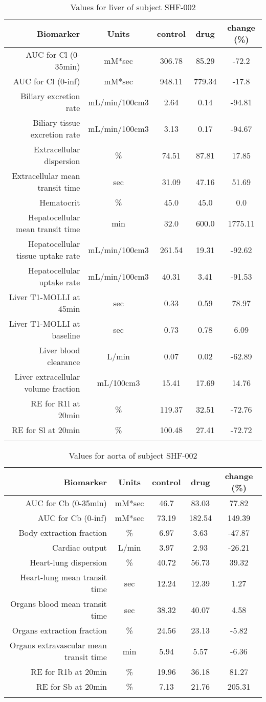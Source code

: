 \documentclass{epflreport}%
\begin{document}
%
\clearpage%
\begin{longtable}{rcccc}%
\hline%
Biomarker&Units&control&drug&change (\%)\\%
\hline%
AUC for Cl (0{-}35min)&mM*sec&306.78&85.29&{-}72.2\\%
AUC for Cl (0{-}inf)&mM*sec&948.11&779.34&{-}17.8\\%
Biliary excretion rate&mL/min/100cm3&2.64&0.14&{-}94.81\\%
Biliary tissue excretion rate&mL/min/100cm3&3.13&0.17&{-}94.67\\%
Extracellular dispersion&\%&74.51&87.81&17.85\\%
Extracellular mean transit time&sec&31.09&47.16&51.69\\%
Hematocrit&\%&45.0&45.0&0.0\\%
Hepatocellular mean transit time&min&32.0&600.0&1775.11\\%
Hepatocellular tissue uptake rate&mL/min/100cm3&261.54&19.31&{-}92.62\\%
Hepatocellular uptake rate&mL/min/100cm3&40.31&3.41&{-}91.53\\%
Liver T1{-}MOLLI at 45min&sec&0.33&0.59&78.97\\%
Liver T1{-}MOLLI at baseline&sec&0.73&0.78&6.09\\%
Liver blood clearance&L/min&0.07&0.02&{-}62.89\\%
Liver extracellular volume fraction&mL/100cm3&15.41&17.69&14.76\\%
RE for R1l at 20min&\%&119.37&32.51&{-}72.76\\%
RE for Sl at 20min&\%&100.48&27.41&{-}72.72\\%
\hline%
\caption{Values for liver of subject SHF-002} \\%
\end{longtable}%
\begin{longtable}{rcccc}%
\hline%
Biomarker&Units&control&drug&change (\%)\\%
\hline%
AUC for Cb (0{-}35min)&mM*sec&46.7&83.03&77.82\\%
AUC for Cb (0{-}inf)&mM*sec&73.19&182.54&149.39\\%
Body extraction fraction&\%&6.97&3.63&{-}47.87\\%
Cardiac output&L/min&3.97&2.93&{-}26.21\\%
Heart{-}lung dispersion&\%&40.72&56.73&39.32\\%
Heart{-}lung mean transit time&sec&12.24&12.39&1.27\\%
Organs blood mean transit time&sec&38.32&40.07&4.58\\%
Organs extraction fraction&\%&24.56&23.13&{-}5.82\\%
Organs extravascular mean transit time&min&5.94&5.57&{-}6.36\\%
RE for R1b at 20min&\%&19.96&36.18&81.27\\%
RE for Sb at 20min&\%&7.13&21.76&205.31\\%
\hline%
\caption{Values for aorta of subject SHF-002} \\%
\end{longtable}%
\clearpage%
\end{document}
